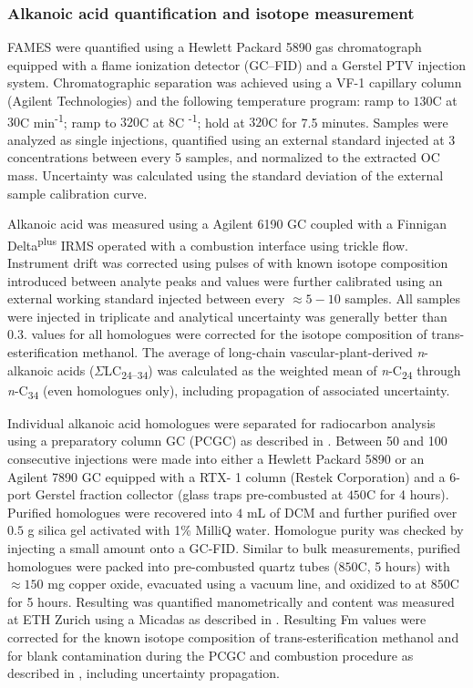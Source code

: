 \subsubsection{Alkanoic acid quantification and isotope measurement}

FAMES were quantified using a Hewlett Packard 5890 gas chromatograph equipped with a flame ionization detector (GC--FID) and a Gerstel PTV injection system. Chromatographic separation was achieved using a VF-1 capillary column (Agilent Technologies) and the following temperature program: ramp to $130$\textdegree C at $30$\textdegree C min\textsuperscript{-1}; ramp to $320$\textdegree C at $8$\textdegree C \textsuperscript{-1}; hold at $320$\textdegree C for 7.5 minutes. Samples were analyzed as single injections, quantified using an external standard injected at 3 concentrations between every 5 samples, and normalized to the extracted OC mass. Uncertainty was calculated using the standard deviation of the external sample calibration curve.

Alkanoic acid  was measured using a Agilent 6190 GC coupled with a Finnigan Delta\textsuperscript{plus} IRMS operated with a combustion interface using  trickle flow. Instrument drift was corrected using pulses of  with known isotope composition introduced between analyte peaks and  values were further calibrated using an external working standard injected between every $\approx 5 - 10$ samples. All samples were injected in triplicate and analytical uncertainty was generally better than 0.3\textperthousand.  values for all homologues were corrected for the isotope composition of trans-esterification methanol. The average of long-chain vascular-plant-derived \textit{n}-alkanoic acids ($\Sigma$LC\textsubscript{24--34}) was calculated as the weighted mean of \textit{n}-C\textsubscript{24} through \textit{n}-C\textsubscript{34} (even homologues only), including propagation of associated uncertainty.

Individual alkanoic acid homologues were separated for radiocarbon analysis using a preparatory column GC (PCGC) as described in \citet{Galy:2011hk}. Between 50 and 100 consecutive injections were made into either a Hewlett Packard 5890 or an Agilent 7890 GC equipped with a RTX- 1 column (Restek Corporation) and a 6-port Gerstel fraction collector (glass traps pre-combusted at $450$\textdegree C for 4 hours). Purified homologues were recovered into $4$ mL of DCM and further purified over $0.5$ g silica gel activated with 1\% MilliQ water. Homologue purity was checked by injecting a small amount onto a GC-FID. Similar to bulk measurements, purified homologues were packed into pre-combusted quartz tubes ($850$\textdegree C, 5 hours) with $\approx 150$ mg copper oxide, evacuated using a vacuum line, and oxidized to  at $850$\textdegree C for 5 hours. Resulting  was quantified manometrically and  content was measured at ETH Zurich using a Micadas as described in \citet{Christl:2013ks}. Resulting Fm values were corrected for the known isotope composition of trans-esterification methanol and for blank contamination during the PCGC and combustion procedure as described in \citet{Fornace:2016th}, including uncertainty propagation.

